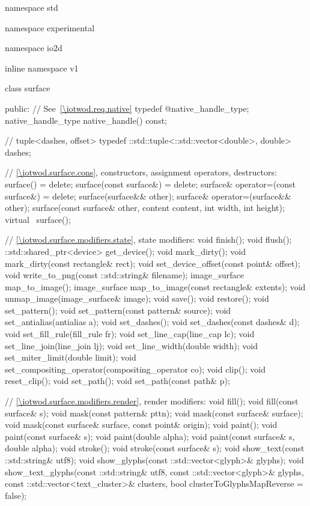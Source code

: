 \begin{codeblock}
namespace std { namespace experimental { namespace io2d { inline namespace v1 {
  class surface {
  public:
    // See~\ref{\iotwod.req.native}
    typedef @\impdef@ native_handle_type;
    native_handle_type native_handle() const;

    // tuple<dashes, offset>
    typedef ::std::tuple<::std::vector<double>, double> dashes;

    // \ref{\iotwod.surface.cons}, constructors, assignment operators, destructors:
    surface() = delete;
    surface(const surface&) = delete;
    surface& operator=(const surface&) = delete;
    surface(surface&& other);
    surface& operator=(surface&& other);
    surface(const surface& other, content content, int width, int height);
    virtual ~surface();

    // \ref{\iotwod.surface.modifiers.state}, state modifiers:
    void finish();
    void flush();
    ::std::shared_ptr<device> get_device();
    void mark_dirty();
    void mark_dirty(const rectangle& rect);
    void set_device_offset(const point& offset);
    void write_to_png(const ::std::string& filename);
    image_surface map_to_image();
    image_surface map_to_image(const rectangle& extents);
    void unmap_image(image_surface& image);
    void save();
    void restore();
    void set_pattern();
    void set_pattern(const pattern& source);
    void set_antialias(antialias a);
    void set_dashes();
    void set_dashes(const dashes& d);
    void set_fill_rule(fill_rule fr);
    void set_line_cap(line_cap lc);
    void set_line_join(line_join lj);
    void set_line_width(double width);
    void set_miter_limit(double limit);
    void set_compositing_operator(compositing_operator co);
    void clip();
    void reset_clip();
    void set_path();
    void set_path(const path& p);

    // \ref{\iotwod.surface.modifiers.render}, render modifiers:
    void fill();
    void fill(const surface& s);
    void mask(const pattern& pttn);
    void mask(const surface& surface);
    void mask(const surface& surface, const point& origin);
    void paint();
    void paint(const surface& s);
    void paint(double alpha);
    void paint(const surface& s, double alpha);
    void stroke();
    void stroke(const surface& s);
    void show_text(const ::std::string& utf8);
    void show_glyphs(const ::std::vector<glyph>& glyphs);
    void show_text_glyphs(const ::std::string& utf8,
      const ::std::vector<glyph>& glyphs,
      const ::std::vector<text_cluster>& clusters, 
      bool clusterToGlyphsMapReverse = false);

}}}}}
\end{codeblock}
